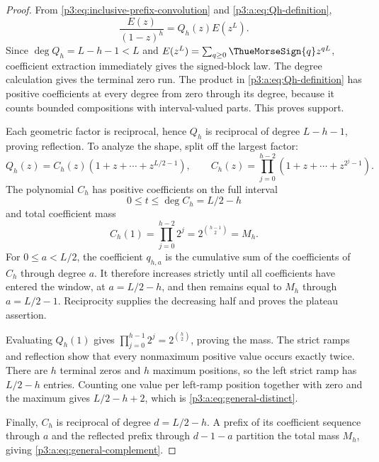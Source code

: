 \documentclass[11pt,oneside]{article}
\numberwithin{equation}{section}
\theoremstyle{definition}
\theoremstyle{remark}
\begin{document}
\begin{proof}
From \eqref{p3:eq:inclusive-prefix-convolution} and \eqref{p3:a:eq:Qh-definition},
\begin{equation}
 \frac{E(z)}{(1-z)^h}=Q_h(z)E(z^L).
 \label{p3:a:eq:block-factorization}
\end{equation}
Since \(\deg Q_h=L-h-1<L\) and
\(E(z^L)=\sum_{q\ge0}\ThueMorseSign{q}z^{qL}\), coefficient extraction immediately
gives the signed-block law.  The degree calculation gives the terminal zero
run.  The product in \eqref{p3:a:eq:Qh-definition} has positive coefficients at
every degree from zero through its degree, because it counts bounded
compositions with interval-valued parts.  This proves support.

Each geometric factor is reciprocal, hence \(Q_h\) is reciprocal of degree
\(L-h-1\), proving reflection.  To analyze the shape, split off the largest
factor:
\begin{equation}
 Q_h(z)=C_h(z)(1+z+\cdots+z^{L/2-1}),
 \qquad
 C_h(z)=\prod_{j=0}^{h-2}(1+z+\cdots+z^{2^j-1}).
 \label{p3:a:eq:Ch-split}
\end{equation}
The polynomial \(C_h\) has positive coefficients on the full interval
\begin{equation}
 0\le t\le\deg C_h=L/2-h
 \label{p3:a:eq:Ch-degree}
\end{equation}
and total coefficient mass
\begin{equation}
 C_h(1)=\prod_{j=0}^{h-2}2^j
 =2^{\binom{h-1}{2}}=M_h.
 \label{p3:a:eq:Ch-mass}
\end{equation}
For \(0\le a<L/2\), the coefficient \(q_{h,a}\) is the cumulative sum of
the coefficients of \(C_h\) through degree \(a\).  It therefore increases
strictly until all coefficients have entered the window, at
\(a=L/2-h\), and then remains equal to \(M_h\) through \(a=L/2-1\).
Reciprocity supplies the decreasing half and proves the plateau assertion.

Evaluating \(Q_h(1)\) gives
\(
\prod_{j=0}^{h-1}2^j=2^{\binom h2}
\), proving the mass.  The strict ramps and reflection show that every
nonmaximum positive value occurs exactly twice.  There are \(h\) terminal
zeros and \(h\) maximum positions, so the left strict ramp has
\(L/2-h\) entries.  Counting one value per left-ramp position together with
zero and the maximum gives \(L/2-h+2\), which is
\eqref{p3:a:eq:general-distinct}.

Finally, \(C_h\) is reciprocal of degree \(d=L/2-h\).  A prefix of its
coefficient sequence through \(a\) and the reflected prefix through
\(d-1-a\) partition the total mass \(M_h\), giving
\eqref{p3:a:eq:general-complement}.
\end{proof}
\end{document}
